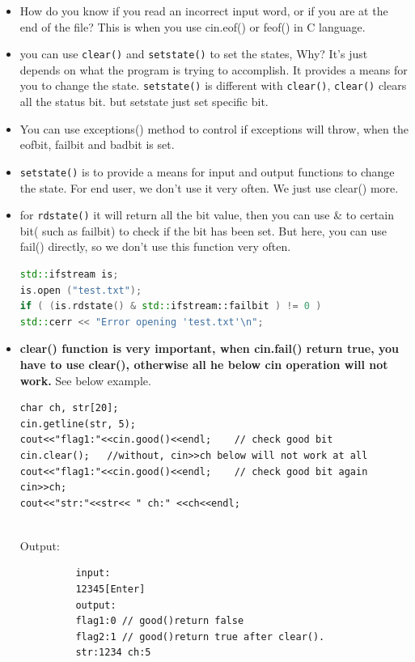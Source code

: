 \documentclass[a4paper,11pt,twoside]{book}
\begin{document}
\begin{itemize}
	\item How do you know if you read an incorrect input word, or if you are at the end of the file? This is when you use cin.eof() or feof() in C language.
	
	
	\item you can use \texttt{clear()} and \texttt{setstate()} to set the states, Why? It's just depends on what the program is trying to accomplish.  It provides a means for you to change the state. \texttt{setstate()} is different with \texttt{clear()}, \texttt{clear()} clears all the status bit. but setstate just set specific bit.
	
	\item You can use exceptions() method to control if exceptions will throw, when the eofbit, failbit and badbit is set.
	
	\item \texttt{setstate()} is to provide a means for input and output functions to change the state. For end user, we don't use it very often. We just use clear() more.
	
	\item for \texttt{rdstate()} it will return all the bit value, then you can use \& to certain bit( such as failbit) to check if the bit has been set. But here, you can use fail() directly, so we don't use this function very often.
\begin{lstlisting}[frame=single, language=c++]
std::ifstream is;
is.open ("test.txt");
if ( (is.rdstate() & std::ifstream::failbit ) != 0 )
std::cerr << "Error opening 'test.txt'\n";
\end{lstlisting}
	
	
	\item \textbf{clear() function is very important, when cin.fail() return true, you have to use clear(), otherwise all he below cin operation will not work.} See below example.
	
\begin{lstlisting}[numbers=none]
char ch, str[20];
cin.getline(str, 5);
cout<<"flag1:"<<cin.good()<<endl;    // check good bit
cin.clear();   //without, cin>>ch below will not work at all
cout<<"flag1:"<<cin.good()<<endl;    // check good bit again
cin>>ch;
cout<<"str:"<<str<< " ch:" <<ch<<endl;
	

\end{lstlisting}
\begin{description}
	\item[Output:] 
	\begin{verbatim}
	input:
	12345[Enter]
	output:
	flag1:0 // good()return false
	flag2:1 // good()return true after clear().
	str:1234 ch:5
	\end{verbatim}
\end{description}
	
\end{itemize}
\end{document}
